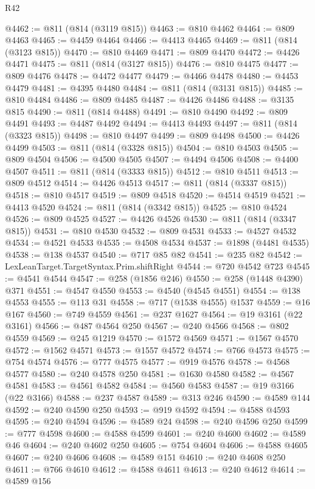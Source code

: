 \begin{lexlean}{R42}
\begin{coremodule}
{@4462 := @811 (@814 (@3119 @815))
@4463 := @810 @4462
@4464 := @809 @4463
@4465 := @4459 @4464
@4466 := @4413 @4465
@4469 := @811 (@814 (@3123 @815))
@4470 := @810 @4469
@4471 := @809 @4470
@4472 := @4426 @4471
@4475 := @811 (@814 (@3127 @815))
@4476 := @810 @4475
@4477 := @809 @4476
@4478 := @4472 @4477
@4479 := @4466 @4478
@4480 := @4453 @4479
@4481 := @4395 @4480
@4484 := @811 (@814 (@3131 @815))
@4485 := @810 @4484
@4486 := @809 @4485
@4487 := @4426 @4486
@4488 := @3135 @815
@4490 := @811 (@814 @4488)
@4491 := @810 @4490
@4492 := @809 @4491
@4493 := @4487 @4492
@4494 := @4413 @4493
@4497 := @811 (@814 (@3323 @815))
@4498 := @810 @4497
@4499 := @809 @4498
@4500 := @4426 @4499
@4503 := @811 (@814 (@3328 @815))
@4504 := @810 @4503
@4505 := @809 @4504
@4506 := @4500 @4505
@4507 := @4494 @4506
@4508 := @4400 @4507
@4511 := @811 (@814 (@3333 @815))
@4512 := @810 @4511
@4513 := @809 @4512
@4514 := @4426 @4513
@4517 := @811 (@814 (@3337 @815))
@4518 := @810 @4517
@4519 := @809 @4518
@4520 := @4514 @4519
@4521 := @4413 @4520
@4524 := @811 (@814 (@3342 @815))
@4525 := @810 @4524
@4526 := @809 @4525
@4527 := @4426 @4526
@4530 := @811 (@814 (@3347 @815))
@4531 := @810 @4530
@4532 := @809 @4531
@4533 := @4527 @4532
@4534 := @4521 @4533
@4535 := @4508 @4534
@4537 := @1898 (@4481 @4535)
@4538 := @138 @4537
@4540 := @717 @85 @82
@4541 := @235 @82
@4542 := LexLeanTarget.TargetSyntax.Prim.shiftRight
@4544 := @720 @4542 @723
@4545 := @4541 @4544
@4547 := @258 (@1856 @246)
@4550 := @258 (@1448 @4390) @371
@4551 := @4547 @4550
@4553 := @4540 (@4545 @4551)
@4554 := @138 @4553
@4555 := @113 @31
@4558 := @717 (@1538 @4555) @1537
@4559 := @16 @167
@4560 := @749 @4559
@4561 := @237 @1627
@4564 := @19 @3161 (@22 @3161)
@4566 := @487 @4564 @250
@4567 := @240 @4566
@4568 := @802 @4559
@4569 := @245 @1219
@4570 := @1572 @4569
@4571 := @1567 @4570
@4572 := @1562 @4571
@4573 := @1557 @4572
@4574 := @766 @4573
@4575 := @754 @4574
@4576 := @777 @4575
@4577 := @919 @4576
@4578 := @4568 @4577
@4580 := @240 @4578 @250
@4581 := @1630 @4580
@4582 := @4567 @4581
@4583 := @4561 @4582
@4584 := @4560 @4583
@4587 := @19 @3166 (@22 @3166)
@4588 := @237 @4587
@4589 := @313 @246
@4590 := @4589 @144
@4592 := @240 @4590 @250
@4593 := @919 @4592
@4594 := @4588 @4593
@4595 := @240 @4594
@4596 := @4589 @24
@4598 := @240 @4596 @250
@4599 := @777 @4598
@4600 := @4588 @4599
@4601 := @240 @4600
@4602 := @4589 @46
@4604 := @240 @4602 @250
@4605 := @754 @4604
@4606 := @4588 @4605
@4607 := @240 @4606
@4608 := @4589 @151
@4610 := @240 @4608 @250
@4611 := @766 @4610
@4612 := @4588 @4611
@4613 := @240 @4612
@4614 := @4589 @156
}
\end{coremodule}
\end{lexlean}
